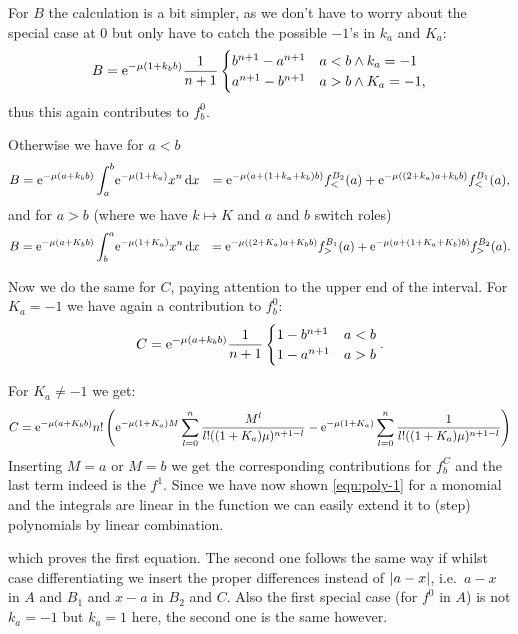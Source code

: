 \begin{Lemma}
\begin{Proof}
    For $B$ the calculation is a bit simpler, as we don't have to worry about
    the special case at 0 but only have to catch the possible $-1$'s in $k_a$
    and $K_a$:
    \begin{align*}
      B = \Eto{-\mu(1 + k_b b)} \frac{1}{n+1} \begin{cases}
        b^{n+1} - a^{n+1} & a<b \wedge k_a = -1 \\
        a^{n+1} - b^{n+1} & a>b \wedge K_a = -1,
      \end{cases}
    \end{align*}
    thus this again contributes to $f^0_b$.

    Otherwise we have for $a < b$
    \begin{align*}
      B &= \Eto{-\mu(a + k_b b)} \Integ[b]{a}{x}{\Eto{-\mu(1+k_a)}x^n}
        &= \Eto{-\mu(a + (1+k_a+k_b)b)} f^{B_2}_<(a)
         + \Eto{-\mu((2+k_a)a +k_b b)} f^{B_1}_<(a),
    \end{align*}
    and for $a > b$ (where we have $k\mapsto K$ and $a$ and $b$ switch roles)
    \begin{align*}
      B &= \Eto{-\mu(a + K_b b)} \Integ[a]{b}{x}{\Eto{-\mu(1+K_a)}x^n}
        &= \Eto{-\mu((2+K_a)a + K_b b)} f^{B_1}_>(a)
         + \Eto{-\mu(a + (1+K_a+K_b)b)} f^{B_2}_>(a).
    \end{align*}

    Now we do the same for $C$, paying attention to the upper end of the
    interval. For $K_a = -1$ we have again a contribution to $f^0_b$:
    \begin{align*}
      C = \Eto{-\mu(a+k_b b)} \frac{1}{n+1} \begin{cases}
        1 - b^{n+1} & a < b \\
        1 - a^{n+1} & a > b
      \end{cases}.
    \end{align*}

    For $K_a \neq -1$ we get:
    \begin{align*}
      C = \Eto{-\mu(a+K_b b)} n! \left(
      \Eto{-\mu(1+K_a)M} \sum_{l=0}^n \frac{M^l}{l!((1+K_a)\mu)^{n+1-l}}
      - \Eto{-\mu(1+K_a)} \sum_{l=0}^n \frac{1}{l!((1+K_a)\mu)^{n+1-l}}
      \right)
    \end{align*}
    Inserting $M=a$ or $M=b$ we get the corresponding contributions for $f^C_b$
    and the last term indeed is the $f^1$. Since we have now shown
    \eqref{eqn:poly-1} for a monomial and the integrals are linear in the
    function we can easily extend it to (step) polynomials by linear
    combination.
    
    which proves the first equation. The
    second one follows the same way if whilst case differentiating we insert the
    proper differences instead of $\Abs{a-x}$, i.e.\ $a-x$ in $A$ and $B_1$ and
    $x - a$ in $B_2$ and $C$. Also the first special case (for $f^0$ in $A$) is
    not $k_a = -1$ but $k_a = 1$ here, the second one is the same however.
  \end{Proof}
\end{Lemma}


